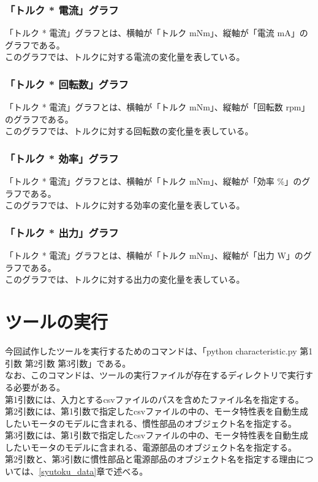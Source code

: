 \subsubsection{「トルク * 電流」グラフ}\label{sub:sub:torden}
「トルク * 電流」グラフとは、横軸が「トルク mNm」、縦軸が「電流 mA」のグラフである。\\
このグラフでは、トルクに対する電流の変化量を表している。
\subsubsection{「トルク * 回転数」グラフ}\label{sub:sub:torkaiten}
「トルク * 電流」グラフとは、横軸が「トルク mNm」、縦軸が「回転数 rpm」のグラフである。\\
このグラフでは、トルクに対する回転数の変化量を表している。
\subsubsection{「トルク * 効率」グラフ}\label{sub:sub:torkouritu}
「トルク * 電流」グラフとは、横軸が「トルク mNm」、縦軸が「効率 \%」のグラフである。\\
このグラフでは、トルクに対する効率の変化量を表している。
\subsubsection{「トルク * 出力」グラフ}\label{sub:sub:torsyutu}
「トルク * 電流」グラフとは、横軸が「トルク mNm」、縦軸が「出力 W」のグラフである。\\
このグラフでは、トルクに対する出力の変化量を表している。
\section{ツールの実行}\label{zikkou}
今回試作したツールを実行するためのコマンドは、「python characteristic.py 第1引数 第2引数 第3引数」である。\\
なお、このコマンドは、ツールの実行ファイルが存在するディレクトリで実行する必要がある。\\
第1引数には、入力とするcsvファイルのパスを含めたファイル名を指定する。\\
第2引数には、第1引数で指定したcsvファイルの中の、モータ特性表を自動生成したいモータのモデルに含まれる、慣性部品のオブジェクト名を指定する。\\
第3引数には、第1引数で指定したcsvファイルの中の、モータ特性表を自動生成したいモータのモデルに含まれる、電源部品のオブジェクト名を指定する。\\
第2引数と、第3引数に慣性部品と電源部品のオブジェクト名を指定する理由については、\ref{syutoku_data}章で述べる。

